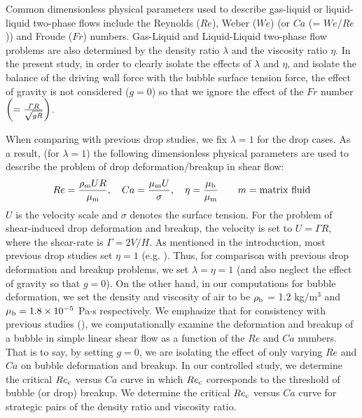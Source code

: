 \documentclass{elsarticle}
\begin{document}
Common dimensionless physical parameters used to describe gas-liquid or
liquid-liquid two-phase flows include the Reynolds ($Re$), Weber ($We$) (or
$Ca$ (= $We/Re$)) and Froude ($Fr$) numbers.  Gas-Liquid and Liquid-Liquid
two-phase flow problems are also determined by the density ratio $\lambda$ and
the viscosity ratio $\eta$.  In the present study, in order to clearly isolate the effects of $\lambda$ and $\eta$, and isolate the balance of the driving wall force with the bubble surface tension force, the effect of gravity is not considered ($g = 0$) so that we ignore the effect of the $Fr$ number 
\textcolor{red}
{
$\left(= \frac{{\it \Gamma}R}{\sqrt {gR}} \right)$.
}

When comparing with previous drop studies, we fix $\lambda=1$ for the drop cases.  As a result, (for $\lambda=1$) the following dimensionless physical parameters are used to describe the problem of drop deformation/breakup in shear flow:
%
\begin{eqnarray}\label{dimensonless}
  Re = \frac{\rho_{\rm m}UR}{\mu_{\rm m}}, \quad
  Ca = \frac{\mu_{\rm m}U}{\sigma}, \quad
  \eta = \frac{\mu_{\rm b}}{\mu_{\rm m}} 
	\hspace{20pt} m=\mbox{matrix fluid}
\end{eqnarray}
%
$U$ is the velocity scale and $\sigma$ denotes the surface tension.  For the problem of shear-induced drop deformation and breakup, the velocity is set to $U = \mathit{\Gamma} R$, where the shear-rate is $\mathit{\Gamma} = 2V/H$.  As mentioned in the introduction, most previous drop studies set $\eta = 1$ (e.g.  \citet{LiRenRen00}).  Thus, for comparison with previous drop deformation and breakup problems, we set $\lambda = \eta = 1$ (and also neglect the effect of gravity so that $g=0$). On the other hand, in our computations for bubble deformation, we set the density and viscosity of air to be $\rho_{\rm b}$ = 1.2 kg/m$^{3}$ and $\mu_{\rm b} = 1.8 \times 10^{-5}$ Pa$\cdot$s respectively.  We emphasize that for consistency with previous studies (\citet{LiRenRen00, RusMan02, MulTobDreFisWin08, KomShaEskDer14, AmaBalCasOli19}), we computationally examine the deformation and breakup of a bubble in simple linear shear flow as a function of the $Re$ and $Ca$ numbers.  That is to say, by setting $g=0$, we are isolating the effect of only varying $Re$ and $Ca$ on bubble deformation and breakup.  In our controlled study, we determine the critical $Re_{\rm c}$ versus $Ca$ curve in which $Re_{\rm c}$ corresponds to the threshold of bubble (or drop) breakup.  We determine the critical $Re_{\rm c}$ versus $Ca$ curve for strategic pairs of the density ratio and viscosity ratio.
\end{document}
